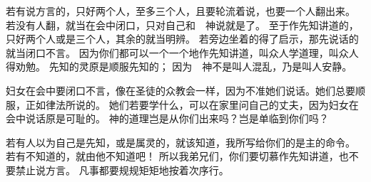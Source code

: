 {若有说方言的，只好两个人，至多三个人，且要轮流着说，也要一个人翻出来。
若没有人翻，就当在会中闭口，只对自己和　神说就是了。
至于作先知讲道的，只好两个人或是三个人，其余的就当{}明辨。
若旁边坐着的得了启示，那先说话的就当闭口不言。
因为你们都可以一个一个地作先知讲道，叫众人学道理，叫众人得劝勉。
先知的灵原是顺服先知的；
因为　神不是叫人混乱，乃是叫人安静。
\par }{\PP {}妇女在会中要闭口不言，像在圣徒的众教会一样，因为不准她们说话。她们总要顺服，正如律法所说的。
她们若要学什么，可以在家里问自己的丈夫，因为妇女在会中说话原是可耻的。
神的道理岂是从你们出来吗？岂是单临到你们吗？
\par }{\PP {}若有人以为自己是先知，或是属灵的，就该知道，我所写给你们的是主的命令。
若有不知道的，就由他不知道吧！
所以我弟兄们，你们要切慕作先知讲道，也不要禁止说方言。
凡事都要规规矩矩地按着次序行。

}
